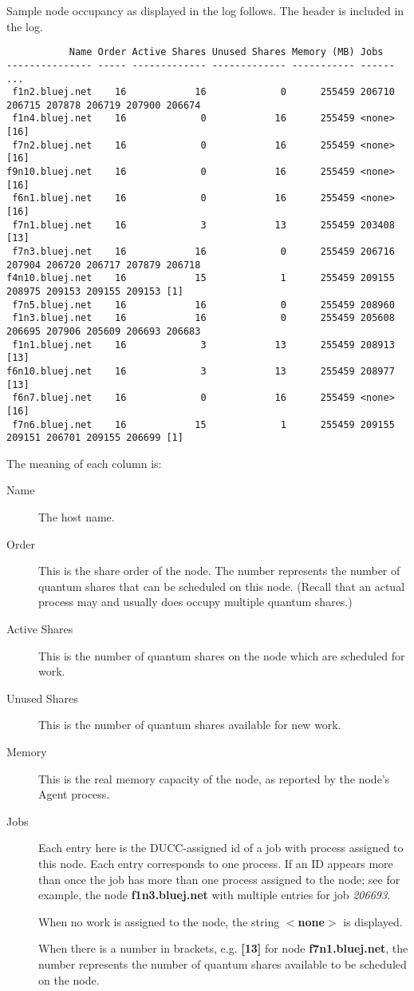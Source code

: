     Sample node occupancy as displayed in the log follows.  The header is included in the log.
\begin{verbatim}
           Name Order Active Shares Unused Shares Memory (MB) Jobs
--------------- ----- ------------- ------------- ----------- ------ ...
 f1n2.bluej.net    16            16             0      255459 206710 206715 207878 206719 207900 206674 
 f1n4.bluej.net    16             0            16      255459 <none>[16]
 f7n2.bluej.net    16             0            16      255459 <none>[16]
f9n10.bluej.net    16             0            16      255459 <none>[16]
 f6n1.bluej.net    16             0            16      255459 <none>[16]
 f7n1.bluej.net    16             3            13      255459 203408 [13]
 f7n3.bluej.net    16            16             0      255459 206716 207904 206720 206717 207879 206718 
f4n10.bluej.net    16            15             1      255459 209155 208975 209153 209155 209153 [1]
 f7n5.bluej.net    16            16             0      255459 208960 
 f1n3.bluej.net    16            16             0      255459 205608 206695 207906 205609 206693 206683 
 f1n1.bluej.net    16             3            13      255459 208913 [13]
f6n10.bluej.net    16             3            13      255459 208977 [13]
 f6n7.bluej.net    16             0            16      255459 <none>[16]
 f7n6.bluej.net    16            15             1      255459 209155 209151 206701 209155 206699 [1]
\end{verbatim}

    The meaning of each column is:
    \begin{description}
      \item[Name] The host name.
      \item[Order] This is the share order of the node.  The number represents the number of quantum shares
        that can be scheduled on this node. (Recall that an actual process may and usually does
        occupy multiple quantum shares.)
      \item[Active Shares] This is the number of quantum shares on the node which are scheduled
        for work.
      \item[Unused Shares] This is the number of quantum shares available for new work.
      \item[Memory] This is the real memory capacity of the node, as reported by the node's
        Agent process.
      \item[Jobs] Each entry here is the DUCC-assigned id of a job with process assigned to
        this node.  Each entry corresponds to one process.  If an ID appears more than 
        once the job has more than one process assigned to the node; see for example, the
        node {\bf f1n3.bluej.net} with multiple entries for job {\em 206693}.

        When no work is assigned to the node, the string {\bf $<$none$>$} is displayed.  
        
        When there is a number in brackets, e.g. {\bf [13]} for node {\bf f7n1.bluej.net}, the
        number represents the number of quantum shares available to be scheduled on the node.
    \end{description}

